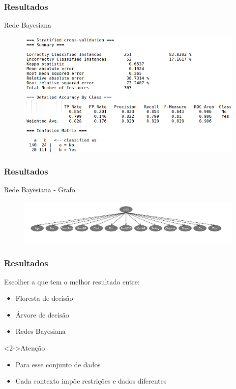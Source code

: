 \documentclass{beamer}
\newcommand{\cmark}{\ding{51}}%
\newcommand{\xmark}{\ding{55}}%
\theoremstyle{theorem}
\theoremstyle{definition}
\begin{document}
\begin{frame}
\frametitle{Resultados}
\begin{block}{Rede Bayesiana}
\end{block}
\begin{figure}[htbp]
	\includegraphics[scale=.35]{fig/result_bayse.png}
\label{fig1}
\end{figure}
\end{frame}

\begin{frame}
\frametitle{Resultados}
\begin{block}{Rede Bayesiana - Grafo}
\end{block}
\begin{figure}[htbp]
	\includegraphics[scale=.23]{fig/BNK2.png}
\label{fig1}
\end{figure}
\end{frame}

\begin{frame}
\frametitle{Resultados}
\begin{block}{Escolher a que tem o melhor resultado entre:}
	\begin{itemize}
		\item Floresta de decisão \xmark
		\item Árvore de decisão \xmark
		\item Redes Bayesiana \cmark
	\end{itemize}
\end{block}

\begin{block}<2->{Atenção}
	\begin{itemize}
		\item Para esse conjunto de dados
		\item Cada contexto impõe restrições e dados diferentes
	\end{itemize}
\end{block}
\end{frame}
\end{document}
